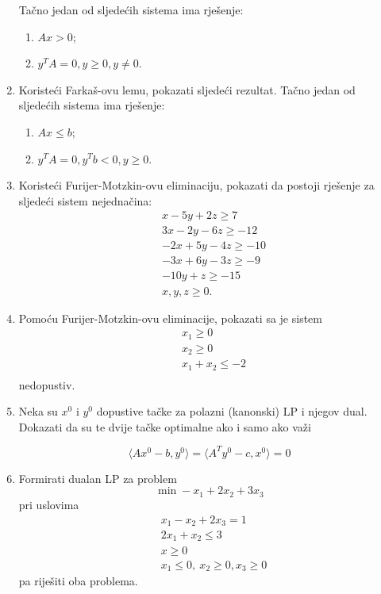 \documentclass[a4paper, utf8, 11pt, colorlinks]{book}
\begin{document}
\begin{enumerate}
	Tačno jedan od sljedećih sistema ima rješenje:%
	\begin{enumerate}
		\item $Ax > 0$; 
		\item $y^T A = 0, y \geq 0, y \neq 0.$
	\end{enumerate}
 \item Koristeći Farkaš-ovu lemu, pokazati sljedeći rezultat. 	Tačno jedan od sljedećih sistema ima rješenje:%
 \begin{enumerate}
 	\item $Ax \leq b$; 
 	\item $y^T A = 0, y^T b < 0, y \geq 0.$
 \end{enumerate}
 \item  %
 Koristeći Furijer-Motzkin-ovu eliminaciju, pokazati da postoji rješenje za sljedeći sistem nejednačina:
 \begin{align*} 
 	&x - 5y + 2 z \geq 7 \\
 	&3x - 2y - 6 z \geq -12 \\
 	& -2x + 5y - 4z \geq -10 \\
 	& -3x + 6y - 3z \geq -9 \\
 	& -10 y + z \geq -15 \\  
 	& x,y,z \geq 0.
 \end{align*}
\item Pomoću Furijer-Motzkin-ovu eliminacije, pokazati sa je sistem 
\begin{align*}
	&x_1 \geq 0 \\
	&x_2 \geq 0 \\
	& x_1 + x_2 \leq -2 \\
\end{align*}
nedopustiv.%

\item Neka su $x^0$ i $y^0$ dopustive tačke za polazni (kanonski) LP i njegov dual. Dokazati da su te dvije tačke optimalne ako i samo ako važi 

$$\langle Ax^0-b,y^0\rangle=\langle A^Ty^0-c,x^0\rangle=0$$

\item Formirati dualan LP za problem
$$\min -x_1+2x_2+3x_3$$
pri uslovima
\begin{align}
	& x_1-x_2+2x_3=1\\
	& 2x_1+x_2\leqslant 3 \\
	& x \geq 0 \\
	& x_1\leqslant 0,\ x_2\geqslant 0, x_3\geqslant 0
\end{align}
pa riješiti oba problema.


\end{enumerate}
\end{document}
